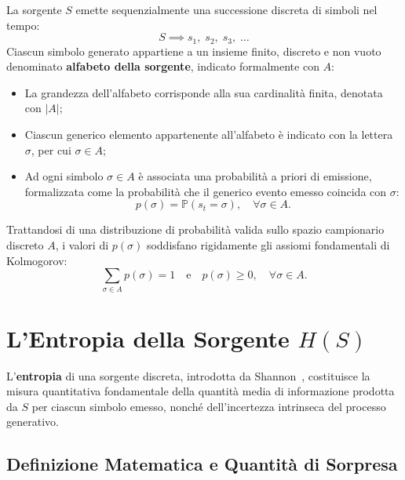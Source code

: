 La sorgente $S$ emette sequenzialmente una successione discreta di simboli nel tempo:
\begin{equation}
  S \implies s_1, \; s_2, \; s_3, \; \dots
\end{equation}
Ciascun simbolo generato appartiene a un insieme finito, discreto e non vuoto denominato \textbf{alfabeto della sorgente}, indicato formalmente con $A$:
\begin{itemize}
  \item La grandezza dell'alfabeto corrisponde alla sua cardinalit\`a finita, denotata con $|A|$;
  \item Ciascun generico elemento appartenente all'alfabeto \`e indicato con la lettera $\sigma$, per cui $\sigma \in A$;
  \item Ad ogni simbolo $\sigma \in A$ \`e associata una probabilit\`a a priori di emissione, formalizzata come la probabilit\`a che il generico evento emesso coincida con $\sigma$:
  \begin{equation}
    p(\sigma) = \mathbb{P}(s_t = \sigma), \quad \forall \sigma \in A.
  \end{equation}
\end{itemize}

Trattandosi di una distribuzione di probabilit\`a valida sullo spazio campionario discreto $A$, i valori di $p(\sigma)$ soddisfano rigidamente gli assiomi fondamentali di Kolmogorov:
\begin{equation}
  \sum_{\sigma \in A} p(\sigma) = 1 \quad \text{e} \quad p(\sigma) \ge 0, \quad \forall \sigma \in A.
  \label{eq:assiomi-probabilita}
\end{equation}

\FloatBarrier
\section{L'Entropia della Sorgente \texorpdfstring{$H(S)$}{H(S)}}
\label{sec:entropia-sorgente}

L'\textbf{entropia} di una sorgente discreta, introdotta da Shannon~\cite{shannon1948}, costituisce la misura quantitativa fondamentale della quantit\`a media di informazione prodotta da $S$ per ciascun simbolo emesso, nonch\'e dell'incertezza intrinseca del processo generativo.

\FloatBarrier
\subsection{Definizione Matematica e Quantit\`a di Sorpresa}
\label{subsec:definizione-entropia}

